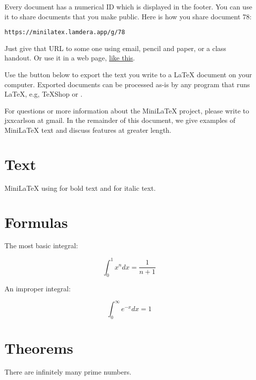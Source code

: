 Every document has a numerical ID which is displayed in the footer.  You can use it to share documents that you make public. Here is how you share document 78:

\begin{verbatim}
https://minilatex.lamdera.app/g/78
\end{verbatim} 

Just give that URL to some one using email, pencil and paper, or a class handout.  Or use it in a web page, \href{https://minilatex.lamdera.app/g/78}{like this}.

 Use the  button below to export the text you write to a
LaTeX document on your computer. Exported documents can
be processed as-is by any program that runs LaTeX,
e.g, TeXShop or .  


For questions or more information about
the MiniLaTeX project, please  write to jxxcarlson at gmail.  In the remainder of this document, we give examples of MiniLaTeX text and discuss features at greater length.

\section{Text}

MiniLaTeX using  for bold text and  for italic text.

\section{Formulas}


The most basic integral:

\begin{equation}
\label{integral:xn}
\int_0^1 x^n dx = \frac{1}{n+1}
\end{equation}

An improper integral:

\begin{equation}
\label{integral:exp}
\int_0^\infty e^{-x} dx = 1
\end{equation}

\section{Theorems}

\begin{theorem}
There are infinitely many prime numbers.
\end{theorem}


